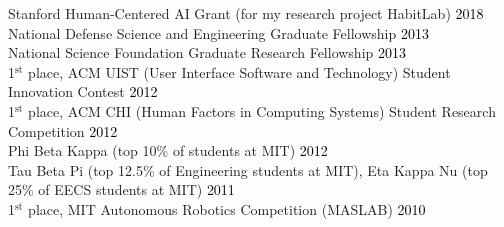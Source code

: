 {}

Stanford Human-Centered AI Grant (for my research project HabitLab) \hfill \textcolor{black}{2018}\\ %
National Defense Science and Engineering Graduate Fellowship \hfill \textcolor{black}{2013}\\ %
National Science Foundation Graduate Research Fellowship \hfill \textcolor{black}{2013}\\ %
1$^{\textrm{st}}$ place, ACM UIST (User Interface Software and Technology) Student Innovation Contest \hfill \textcolor{black}{2012}\\
1$^{\textrm{st}}$ place, ACM CHI (Human Factors in Computing Systems) Student Research Competition \hfill \textcolor{black}{2012}\\
Phi Beta Kappa (top 10\% of students at MIT) \hfill \textcolor{black}{2012}\\
Tau Beta Pi (top 12.5\% of Engineering students at MIT), Eta Kappa Nu (top 25\% of EECS students at MIT) \hfill \textcolor{black}{2011}\\
1$^{\textrm{st}}$ place, MIT Autonomous Robotics Competition (MASLAB) \hfill \textcolor{black}{2010}\\
